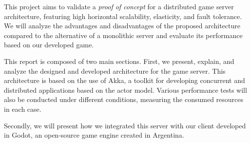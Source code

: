 \noindent This project aims to validate a \textit{proof of concept} for a distributed game server architecture, featuring high horizontal scalability, elasticity, and fault tolerance. We will analyze the advantages and disadvantages of the proposed architecture compared to the alternative of a monolithic server and evaluate its performance based on our developed game.

This report is composed of two main sections. First, we present, explain, and analyze the designed and developed architecture for the game server. This architecture is based on the use of Akka, a toolkit for developing concurrent and distributed applications based on the actor model. Various performance tests will also be conducted under different conditions, measuring the consumed resources in each case.

Secondly, we will present how we integrated this server with our client developed in Godot, an open-source game engine created in Argentina.
